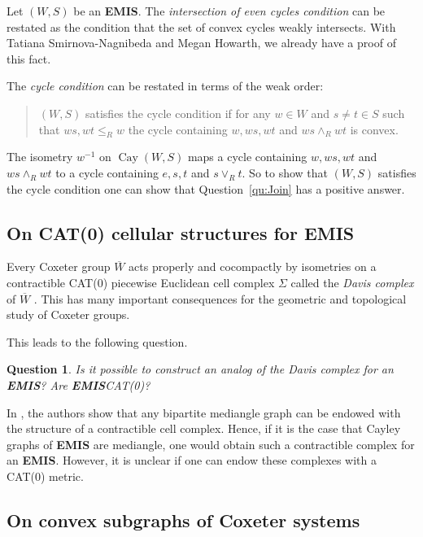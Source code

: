 \documentclass[A4paper, oneside]{amsart}
\newcommand{\id}{\textit{e}}
\newcommand{\Cay}{\operatorname{Cay}}
\newcommand{\EMIS}{\textnormal{\bf EMIS}\xspace}
\newtheorem{question}{Question}
\theoremstyle{definition}
\begin{document}
    Let $(W,S)$ be an \EMIS. The {\em intersection of even cycles condition} can be restated as the condition that the set of convex cycles weakly intersects. With Tatiana Smirnova-Nagnibeda and Megan Howarth, we already have a proof of this fact.
    
    The {\em cycle condition} can be restated in terms of the weak order: 

    \begin{quote}
        \noindent {\bf The cycle condition for an \EMIS.} $(W,S)$ satisfies the cycle condition if for any $w\in W$ and $s\neq t\in S$ such that $ws,wt\leq_R w$ the cycle containing $w,ws,wt$ and $ws\wedge_R wt$ is convex.   
    \end{quote}

The isometry $w^{-1}$ on $\Cay(W,S)$ maps a cycle containing $w,ws,wt$ and $ws\wedge_R wt$ to a cycle containing $\id, s, t$ and $s\vee_R t$. So to show that $(W,S)$ satisfies the cycle condition one can show that Question~\ref{qu:Join} has a positive answer.


\subsection{On CAT(0) cellular structures for \EMIS}

Every Coxeter group $\overline{W}$ acts properly and cocompactly by isometries on a contractible CAT(0) piecewise Euclidean cell complex $\Sigma$ called the \emph{Davis complex} of $\overline{W}$ \cite{Davisbook, Moussong}. This has many important consequences for the geometric and topological study of Coxeter groups.

This leads to the following question.

\begin{question} \label{qu: Davis complex}
	Is it possible to construct an analog of the Davis complex for an \EMIS? Are \EMIS \emph{CAT(0)}?
\end{question}

In \cite{chepoicellular}, the authors show that any bipartite mediangle graph can be endowed with the structure of a contractible cell complex. Hence, if it is the case that Cayley graphs of \EMIS are mediangle, one would obtain such a contractible complex for an \EMIS. However, it is unclear if one can endow these complexes with a CAT(0) metric.


\subsection{On convex subgraphs of Coxeter systems}
\end{document}
